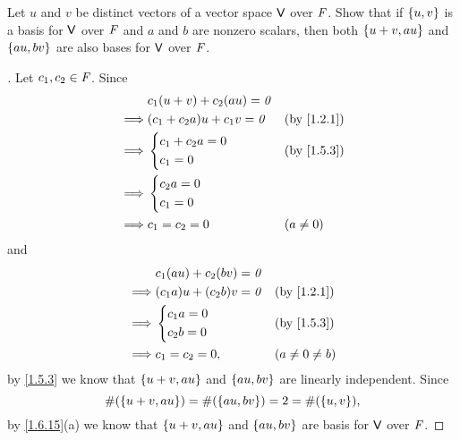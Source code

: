 \exercisesection

\setcounter{ex}{10}
\begin{ex}\label{ex:1.6.11}
  Let \(u\) and \(v\) be distinct vectors of a vector space \(\mathsf{V}\) over \(\mathit{F}\).
  Show that if \(\left\lbrace u, v\right\rbrace\) is a basis for \(\mathsf{V}\) over \(\mathit{F}\) and \(a\) and \(b\) are nonzero scalars, then both \(\left\lbrace u + v, au\right\rbrace\) and \(\left\lbrace au, bv\right\rbrace\) are also bases for \(\mathsf{V}\) over \(\mathit{F}\).
\end{ex}

\begin{proof}[]
  Let \(c_1, c_2 \in \mathit{F}\).
  Since
  \begin{align*}
             & c_1 (u + v) + c_2 (au) = \zv                                \\
    \implies & (c_1 + c_2 a) u + c_1 v = \zv &  & \text{(by \cref{1.2.1})} \\
    \implies & \begin{dcases}
                 c_1 + c_2 a = 0 \\
                 c_1 = 0
               \end{dcases}            &  & \text{(by \cref{1.5.3})}       \\
    \implies & \begin{dcases}
                 c_2 a = 0 \\
                 c_1 = 0
               \end{dcases}                                               \\
    \implies & c_1 = c_2 = 0                 &  & (a \neq 0)
  \end{align*}
  and
  \begin{align*}
             & c_1 (au) + c_2 (bv) = \zv                                 \\
    \implies & (c_1 a) u + (c_2 b) v = \zv &  & \text{(by \cref{1.2.1})} \\
    \implies & \begin{dcases}
                 c_1 a = 0 \\
                 c_2 b = 0
               \end{dcases}              &  & \text{(by \cref{1.5.3})}   \\
    \implies & c_1 = c_2 = 0,              &  & (a \neq 0 \neq b)
  \end{align*}
  by \cref{1.5.3} we know that \(\left\lbrace u + v, au\right\rbrace\) and \(\left\lbrace au, bv\right\rbrace\) are linearly independent.
  Since
  \[
    \#(\left\lbrace u + v, au\right\rbrace) = \#(\left\lbrace au, bv\right\rbrace) = 2 = \#(\left\lbrace u, v\right\rbrace),
  \]
  by \cref{1.6.15}(a) we know that \(\left\lbrace u + v, au\right\rbrace\) and \(\left\lbrace au, bv\right\rbrace\) are basis for \(\mathsf{V}\) over \(\mathit{F}\).
\end{proof}

